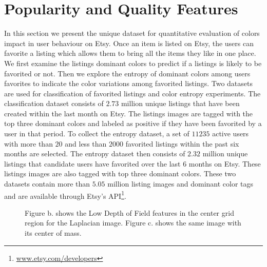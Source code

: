 \documentclass[conference,a4paper]{IEEEtran}
\begin{document}
\section{Popularity and Quality Features}
\label{sec:experiments}
In this section we present the unique dataset for quantitative evaluation of colors
impact in user behaviour on Etsy. Once an item is listed on Etsy, the
users can favorite a listing which allows them to bring all the items
they like in one place. We first examine the listings dominant colors
to predict if a listings is likely to be favorited or not. Then we
explore the entropy of dominant colors among users favorites to
indicate the color variations among favorited listings.
 Two datasets are used for
classification of favorited listings and color entropy
experiments. The classification dataset consists of $2.73$ million unique
listings that have been created within the last month on Etsy. The
listings images are tagged with the top three dominant colors and
labeled as positive if they have been favorited by a user in that period. 
To collect the entropy dataset, a set of $11235$ active users with more
than $20$ and less than $2000$ favorited listings within the past six
months are selected. The entropy dataset then consists of $2.32$ million unique listings that candidate
users have favorited over the last 6 months on Etsy. These listings
images are also tagged with top three dominant colors. These two
datasets contain more than $5.05$ million listing images and dominant
color tags and are available through Etsy's API\footnote{\url{www.etsy.com/developers}}.

\begin{figure}
  \centering
  \caption{
  Figure b. shows the Low Depth of Field features in the center grid region for the Laplacian image.  Figure c. shows the same image with its center of mass.
  }
  \label{fig:lowdof}
\end{figure}
\end{document}
